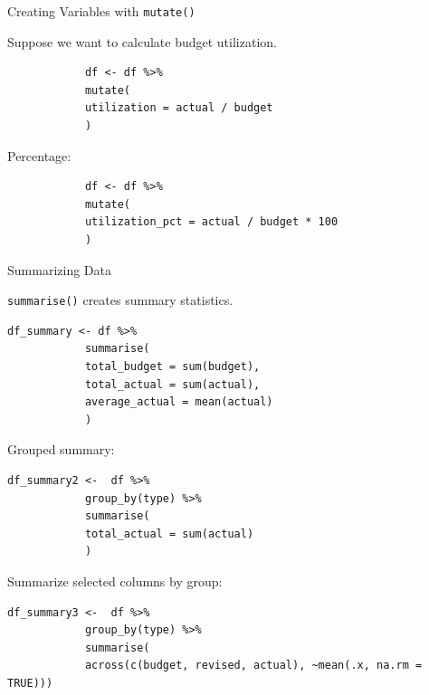 \documentclass[aspectratio=169,11pt]{beamer}
\begin{document}
	
	\begin{frame}[fragile]{Creating Variables with \texttt{mutate()}}
		
		Suppose we want to calculate budget utilization.
		
		\begin{lstlisting}
			df <- df %>%
			mutate(
			utilization = actual / budget
			)
		\end{lstlisting}
		
		Percentage:
		
		\begin{lstlisting}
			df <- df %>%
			mutate(
			utilization_pct = actual / budget * 100
			)
		\end{lstlisting}
		
	\end{frame}
	
	
	\begin{frame}[fragile]{Summarizing Data}
		
		\texttt{summarise()} creates summary statistics.
		
		\begin{lstlisting}[basicstyle=\scriptsize\ttfamily]
		df_summary <- df %>%
			summarise(
			total_budget = sum(budget),
			total_actual = sum(actual),
			average_actual = mean(actual)
			)
		\end{lstlisting}
		
		Grouped summary:
		
		\begin{lstlisting}[basicstyle=\scriptsize\ttfamily]
		df_summary2 <-	df %>%
			group_by(type) %>%
			summarise(
			total_actual = sum(actual)
			)
		\end{lstlisting}
		
		Summarize selected columns by group:
		\begin{lstlisting}[basicstyle=\scriptsize\ttfamily]
		df_summary3 <-	df %>%
			group_by(type) %>%
			summarise(
			across(c(budget, revised, actual), ~mean(.x, na.rm = TRUE)))
		\end{lstlisting}
				
		
		
	\end{frame}
	
\end{document}
